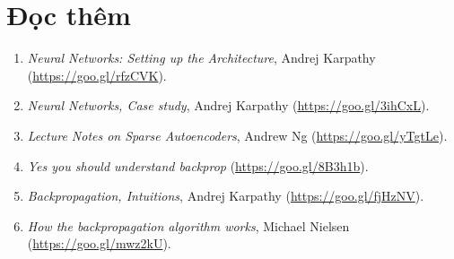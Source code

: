 \newpage
\section{Đọc thêm}
\begin{enumerate}
\item \textit{Neural Networks: Setting up the Architecture}, Andrej Karpathy
(\url{https://goo.gl/rfzCVK}).

\item \textit{Neural Networks, Case study}, Andrej Karpathy
(\url{https://goo.gl/3ihCxL}).

\item \textit{Lecture Notes on Sparse Autoencoders}, Andrew Ng
(\url{https://goo.gl/yTgtLe}).

\item \textit{Yes you should understand backprop} (\url{https://goo.gl/8B3h1b}).

\item \textit{Backpropagation, Intuitions}, Andrej Karpathy
(\url{https://goo.gl/fjHzNV}).

\item \textit{How the backpropagation algorithm works}, Michael Nielsen
(\url{https://goo.gl/mwz2kU}).
\end{enumerate}




